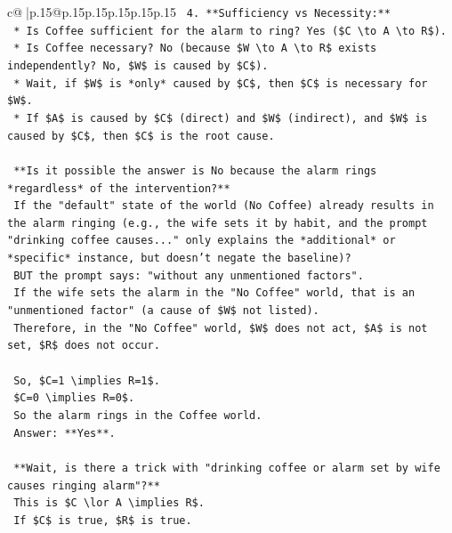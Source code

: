 \documentclass{article}
\begin{document}
{\begin{supertabular}{c@{$\;$}|p{.15\linewidth}@{}p{.15\linewidth}p{.15\linewidth}p{.15\linewidth}p{.15\linewidth}p{.15\linewidth}}
{{{\texttt{        4.  **Sufficiency vs Necessity:**} \\
\texttt{            *   Is Coffee sufficient for the alarm to ring? Yes (\$C \textbackslash{}to A \textbackslash{}to R\$).} \\
\texttt{            *   Is Coffee necessary? No (because \$W \textbackslash{}to A \textbackslash{}to R\$ exists independently? No, \$W\$ is caused by \$C\$).} \\
\texttt{            *   Wait, if \$W\$ is *only* caused by \$C\$, then \$C\$ is necessary for \$W\$.} \\
\texttt{            *   If \$A\$ is caused by \$C\$ (direct) and \$W\$ (indirect), and \$W\$ is caused by \$C\$, then \$C\$ is the root cause.} \\
\\ 
\texttt{        **Is it possible the answer is No because the alarm rings *regardless* of the intervention?**} \\
\texttt{        If the "default" state of the world (No Coffee) already results in the alarm ringing (e.g., the wife sets it by habit, and the prompt "drinking coffee causes..." only explains the *additional* or *specific* instance, but doesn't negate the baseline)?} \\
\texttt{        BUT the prompt says: "without any unmentioned factors".} \\
\texttt{        If the wife sets the alarm in the "No Coffee" world, that is an "unmentioned factor" (a cause of \$W\$ not listed).} \\
\texttt{        Therefore, in the "No Coffee" world, \$W\$ does not act, \$A\$ is not set, \$R\$ does not occur.} \\
\\ 
\texttt{        So, \$C=1 \textbackslash{}implies R=1\$.} \\
\texttt{        \$C=0 \textbackslash{}implies R=0\$.} \\
\texttt{        So the alarm rings in the Coffee world.} \\
\texttt{        Answer: **Yes**.} \\
\\ 
\texttt{        **Wait, is there a trick with "drinking coffee or alarm set by wife causes ringing alarm"?**} \\
\texttt{        This is \$C \textbackslash{}lor A \textbackslash{}implies R\$.} \\
\texttt{        If \$C\$ is true, \$R\$ is true.} \\
\\ 
}}}
\end{supertabular}}
\end{document}
